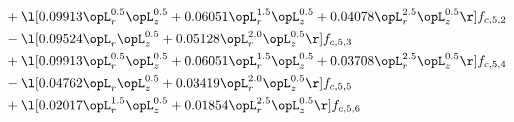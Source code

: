 \begin{alignat}{2}
& + \l[  0.09913 \opL_r^{0.5} \opL_z^{0.5} +  0.06051 \opL_r^{1.5} \opL_z^{0.5} +  0.04078 \opL_r^{2.5} \opL_z^{0.5}  \r] f_{c,5,2} \nonumber \\ 
& - \l[  0.09524 \opL_r \opL_z^{0.5} +  0.05128 \opL_r^{2.0} \opL_z^{0.5}  \r] f_{c,5,3} \nonumber \\ 
& + \l[  0.09913 \opL_r^{0.5} \opL_z^{0.5} +  0.06051 \opL_r^{1.5} \opL_z^{0.5} +  0.03708 \opL_r^{2.5} \opL_z^{0.5}  \r] f_{c,5,4} \nonumber \\ 
& - \l[  0.04762 \opL_r \opL_z^{0.5} +  0.03419 \opL_r^{2.0} \opL_z^{0.5}  \r] f_{c,5,5} \nonumber \\ 
& + \l[  0.02017 \opL_r^{1.5} \opL_z^{0.5} +  0.01854 \opL_r^{2.5} \opL_z^{0.5}  \r] f_{c,5,6} \nonumber \\ 
\end{alignat} 


